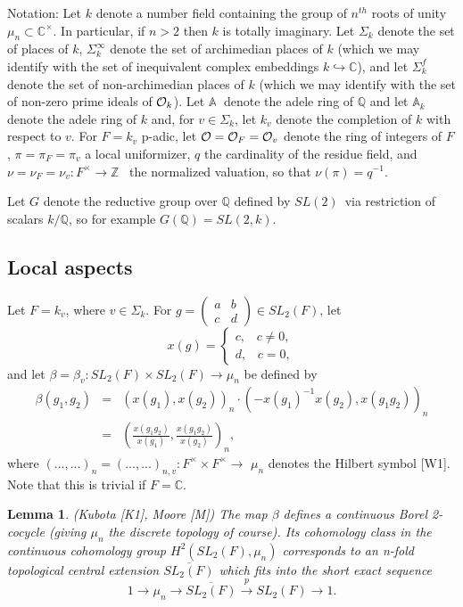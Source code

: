 \documentclass[12pt]{article}
\newtheorem{lemma}[theorem]{Lemma}
\def\aaa{\mathbb{A}}
\def\qqq{\mathbb{Q}}
\def\ccc{\mathbb{C}}
\begin{document}
Notation: Let $k$ denote a number field containing the group of $n^{th}$
roots of unity $\mu _n\subset \ccc ^{\times }$. In particular, if $n>2$
then $k$ is totally imaginary. Let $\Sigma _k$ denote the set of places of $k
$, $\Sigma _k^\infty $ denote the set of archimedian places of $k$ (which we
may identify with the set of inequivalent complex embeddings $k\hookrightarrow 
\ccc $), and let $\Sigma _k^f$ denote the set of non-archimedian places of 
$k$ (which we may identify with the set of non-zero prime ideals of $%
{\cal{O}}_k$). Let $\aaa $ $\;$denote the adele ring of $\qqq$ and
let $\aaa _k$ denote the adele ring of $k$ and, for $v\in \Sigma _k$, let $%
k_v$ denote the completion of $k$ with respect to $v$. For $F=k_v$ p-adic,
let ${\cal{O}}={\cal{O}}_F={\cal{O}}_v$ denote the ring of integers of 
$F$, $\pi =\pi _F=\pi _v$ a local uniformizer, $q$ the cardinality of the
residue field, and $\nu =\nu _F=\nu _v:F^{\times }\rightarrow {\mathbb{Z}}$ \ the
normalized valuation, so that $\nu (\pi )=q^{-1}$.

Let $G$ denote the reductive group over $\qqq$ defined by $SL(2)$\ via
restriction of scalars $k/\qqq$, so for example $G(\qqq)=SL(2,k)$.

\subsection{Local aspects}

Let $F=k_v$, where $v\in \Sigma _k$. For $g=\left( 
\begin{array}{cc}
a & b \\ 
c & d
\end{array}
\right) \in SL_2(F)$, let 
\[
x(g)=\left\{ 
\begin{array}{c}
c,\;\;\;c\neq 0, \\ 
d,\;\;\;c=0,
\end{array}
\right. 
\]
and let $\beta =\beta _v:SL_2(F)\times SL_2(F)\rightarrow \mu _n$ be defined
by 
\begin{eqnarray*}
\beta (g_1,g_2) &=&(x(g_1),x(g_2))_n\cdot (-x(g_1)^{-1}x(g_2),x(g_1g_2))_n \\
&=&(\frac{x(g_1g_2)}{x(g_1)},\frac{x(g_1g_2)}{x(g_2)})_n,
\end{eqnarray*}
where $(...,...)_n=(...,...)_{n,v}:F^{\times }\times F^{\times }\rightarrow $
$\mu _n$ denotes the Hilbert symbol [W1]. Note that this is trivial if $F=%
\ccc $.

\begin{lemma}
(Kubota [K1], Moore [M]) The map $\beta $ defines a continuous Borel
2-cocycle (giving $\mu _n$ the discrete topology of course). Its cohomology
class in the continuous cohomology group $H^2(SL_2(F),\mu _n)$ corresponds
to an n-fold topological central extension $\overline{SL_2(F)}$ which fits
into the short exact sequence 
\[
1\rightarrow \mu _n\rightarrow \overline{SL_2(F)}\stackrel{p}{\rightarrow }%
SL_2(F)\rightarrow 1.
\]
\end{lemma}
\end{document}
